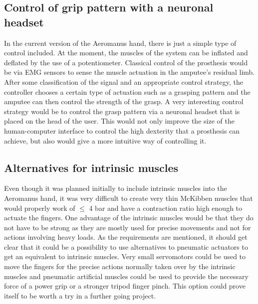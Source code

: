 \documentclass[main]{subfiles}
\begin{document}
\subsection{Control of grip pattern with a neuronal headset}
In the current version of the Aeromanus hand, there is just a simple type of control included. At the moment, the muscles of the system can be inflated and deflated by the use of a potentiometer. Classical control of the prosthesis would be via EMG sensors to sense the muscle actuation in the amputee's residual limb. After some classification of the signal and an appropriate control strategy, the controller chooses a certain type of actuation such as a grasping pattern and the amputee can then control the strength of the grasp. A very interesting control strategy would be to control the grasp pattern via a neuronal headset that is placed on the head of the user. This would not only improve the size of the human-computer interface to control the high dexterity that a prosthesis can achieve, but also would give a more intuitive way of controlling it.


\subsection{Alternatives for intrinsic muscles}
Even though it was planned initially to include intrinsic muscles into the Aeromanus hand, it was very difficult to create very thin McKibben muscles that would properly work of $\leq$ 4 bar and have a contraction ratio high enough to actuate the fingers. One advantage of the intrinsic muscles would be that they do not have to be strong as they are mostly used for precise movements and not for actions involving heavy loads. As the requirements are mentioned, it should get clear that it could be a possibility to use alternatives to pneumatic actuators to get an equivalent to intrinsic muscles. Very small servomotors could be used to move the fingers for the precise actions normally taken over by the intrinsic muscles and pneumatic artificial muscles could be used to provide the necessary force of a power grip or a stronger tripod finger pinch. This option could prove itself to be worth a try in a further going project.
\end{document}

